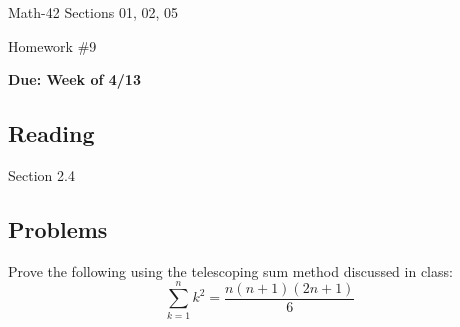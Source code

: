 \documentclass[letterpaper,12pt,fleqn]{article}
\begin{document}
\begin{center}
  \large
  Math-42 Sections 01, 02, 05

  \Large
  Homework \#9

  \large
  \textbf{Due: Week of 4/13}
\end{center}

\subsection*{Reading}

Section 2.4

\subsection*{Problems}

Prove the following using the telescoping sum method discussed in class:
\[\sum_{k=1}^nk^2=\frac{n(n+1)(2n+1)}{6}\]
\end{document}
